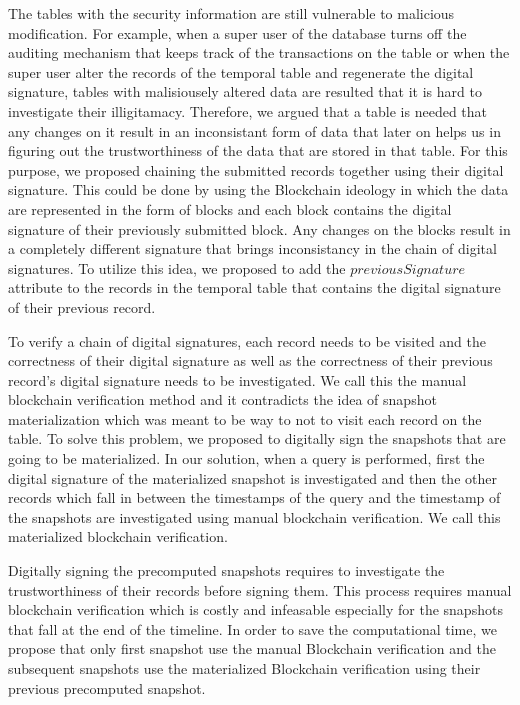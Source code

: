 		The tables with the security information are still vulnerable to malicious modification. For example, when a super user of the database turns off the auditing mechanism that keeps track of the transactions on the table or when the super user alter the records of the temporal table and regenerate the digital signature, tables with malisiousely altered data are resulted that it is hard to investigate their illigitamacy. Therefore, we argued that a table is needed that any changes on it result in an inconsistant form of data that later on helps us in figuring out the trustworthiness of the data that are stored in that table. For this purpose, we proposed chaining the submitted records together using their digital signature. This could be done by using the Blockchain ideology in which the data are represented in the form of blocks and each block contains the digital signature of their previously submitted block. Any changes on the blocks result in a completely different signature that brings inconsistancy in the chain of digital signatures. To utilize this idea, we proposed to add the $previousSignature$ attribute to the records in the temporal table that contains the digital signature of their previous record.

		To verify a chain of digital signatures, each record needs to be visited and the correctness of their digital signature as well as the correctness of their previous record's digital signature needs to be investigated. We call this the manual blockchain verification method and it contradicts the idea of snapshot materialization which was meant to be way to not to visit each record on the table. To solve this problem, we proposed to digitally sign the snapshots that are going to be materialized. In our solution, when a query is performed, first the digital signature of the materialized snapshot is investigated and then the other records which fall in between the timestamps of the query and the timestamp of the snapshots are investigated using manual blockchain verification. We call this materialized blockchain verification.
		
		Digitally signing the precomputed snapshots requires to investigate the trustworthiness of their records before signing them. This process requires manual blockchain verification which is costly and infeasable especially for the snapshots that fall at the end of the timeline. In order to save the computational time, we propose that only first snapshot use the manual Blockchain verification and the subsequent snapshots use the materialized Blockchain verification using their previous precomputed snapshot.
